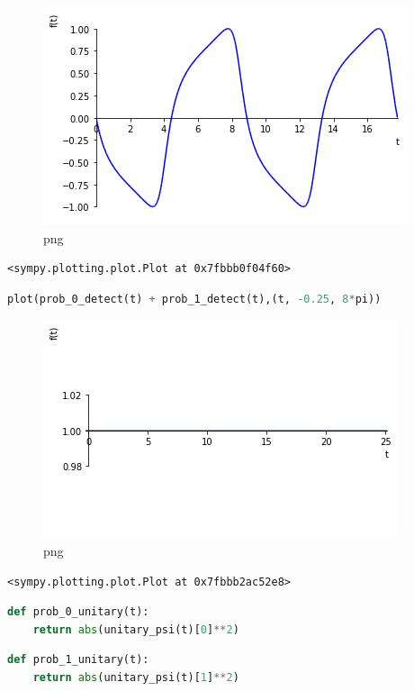 \begin{figure}
\centering
\includegraphics[width=0.66\linewidth]{output_36_0.png}
\caption[]{png}
\end{figure}

\begin{lstlisting}
<sympy.plotting.plot.Plot at 0x7fbbb0f04f60>
\end{lstlisting}

\begin{lstlisting}[language=Python]
plot(prob_0_detect(t) + prob_1_detect(t),(t, -0.25, 8*pi))
\end{lstlisting}

\begin{figure}
\centering
\includegraphics[width=0.66\linewidth]{output_37_0.png}
\caption[]{png}
\end{figure}

\begin{lstlisting}
<sympy.plotting.plot.Plot at 0x7fbbb2ac52e8>
\end{lstlisting}

\begin{lstlisting}[language=Python]
def prob_0_unitary(t):
    return abs(unitary_psi(t)[0]**2)
\end{lstlisting}

\begin{lstlisting}[language=Python]
def prob_1_unitary(t):
    return abs(unitary_psi(t)[1]**2)
\end{lstlisting}

